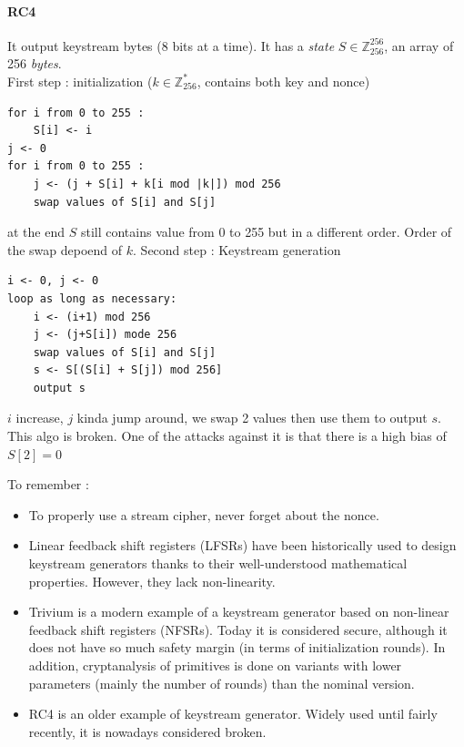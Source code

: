 \documentclass[11pt,a4paper]{report}
\begin{document}
\paragraph{RC4}
It output keystream bytes (8 bits at a time). It has a \emph{state} $S \in \mathbb{Z}^{256}_{256}$, an array of 256 \emph{bytes}.\\
First step : initialization ($k \in \mathbb{Z}^{*}_{256}$, contains both key and nonce)\\
\vspace{-6mm}
\begin{verbatim}
for i from 0 to 255 :
	S[i] <- i
j <- 0
for i from 0 to 255 :
	j <- (j + S[i] + k[i mod |k|]) mod 256
	swap values of S[i] and S[j]
\end{verbatim}
at the end $S$ still contains value from 0 to 255 but in a different order. Order of the swap depoend of $k$.
Second step : Keystream generation
\vspace{-6mm}
\begin{verbatim}
i <- 0, j <- 0
loop as long as necessary:
	i <- (i+1) mod 256
	j <- (j+S[i]) mode 256
	swap values of S[i] and S[j]
	s <- S[(S[i] + S[j]) mod 256]
	output s
\end{verbatim}
$i$ increase, $j$ kinda jump around, we swap 2 values then use them to output $s$.\\
This algo is broken. One of the attacks against it is that there is a high bias of $S[2] = 0$

To remember :
\begin{itemize}
\item To properly use a stream cipher, never forget about the nonce.
\item Linear feedback shift registers (LFSRs) have been historically used to design keystream generators thanks to their well-understood mathematical properties. However, they lack non-linearity.
\item Trivium is a modern example of a keystream generator based on non-linear feedback shift registers (NFSRs). Today it is considered secure, although it does not have so much safety margin (in terms of initialization rounds). In addition, cryptanalysis of primitives is done on variants with lower parameters (mainly the number of rounds) than the nominal version.
\item RC4 is an older example of keystream generator. Widely used until fairly recently, it is nowadays considered broken.
\end{itemize}
\end{document}
